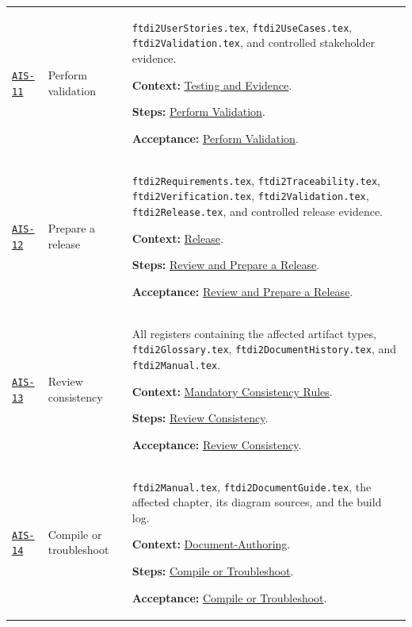 \begin{tabularx}{\linewidth}{L{1.6cm}L{3.1cm}Y}
\label{Skill:AIS-11}\hyperref[Section:AIValidationSteps]{\texttt{AIS-11}} & Perform validation & \texttt{ftdi2UserStories.tex}, \texttt{ftdi2UseCases.tex}, \texttt{ftdi2Validation.tex}, and controlled stakeholder evidence.\par\textbf{Context:} \hyperref[Section:AITestingContext]{Testing and Evidence}.\par\textbf{Steps:} \hyperref[Section:AIValidationTaskSteps]{Perform Validation}.\par\textbf{Acceptance:} \hyperref[Section:AIValidationAcceptance]{Perform Validation}.\\
\label{Skill:AIS-12}\hyperref[Section:AIReleaseSteps]{\texttt{AIS-12}} & Prepare a release & \texttt{ftdi2Requirements.tex}, \texttt{ftdi2Traceability.tex}, \texttt{ftdi2Verification.tex}, \texttt{ftdi2Validation.tex}, \texttt{ftdi2Release.tex}, and controlled release evidence.\par\textbf{Context:} \hyperref[Section:AIReleaseContext]{Release}.\par\textbf{Steps:} \hyperref[Section:AIReleaseTaskSteps]{Review and Prepare a Release}.\par\textbf{Acceptance:} \hyperref[Section:AIReleaseAcceptance]{Review and Prepare a Release}.\\
\label{Skill:AIS-13}\hyperref[Section:AIConsistencySteps]{\texttt{AIS-13}} & Review consistency & All registers containing the affected artifact types, \texttt{ftdi2Glossary.tex}, \texttt{ftdi2DocumentHistory.tex}, and \texttt{ftdi2Manual.tex}.\par\textbf{Context:} \hyperref[Section:AIConsistencyRules]{Mandatory Consistency Rules}.\par\textbf{Steps:} \hyperref[Section:AIConsistencyTaskSteps]{Review Consistency}.\par\textbf{Acceptance:} \hyperref[Section:AIConsistencyAcceptance]{Review Consistency}.\\
\label{Skill:AIS-14}\hyperref[Section:AIBuildSteps]{\texttt{AIS-14}} & Compile or troubleshoot & \texttt{ftdi2Manual.tex}, \texttt{ftdi2DocumentGuide.tex}, the affected chapter, its diagram sources, and the build log.\par\textbf{Context:} \hyperref[Section:AIDocumentContext]{Document-Authoring}.\par\textbf{Steps:} \hyperref[Section:AIBuildTaskSteps]{Compile or Troubleshoot}.\par\textbf{Acceptance:} \hyperref[Section:AIBuildAcceptance]{Compile or Troubleshoot}.\\
\end{tabularx}
\normalsize

